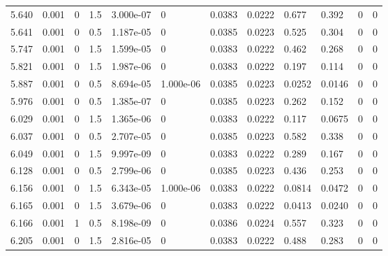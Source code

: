 \documentclass[preview]{standalone}
\begin{document}
{{{\begin{tabular}{L{1.2cm}C{1.2cm} C{0.3cm}C{0.5cm} C{1.4cm}C{1.4cm} C{1.4cm}C{1.4cm} C{1.6cm}C{1.6cm} C{1.6cm}C{1.6cm}}
  5.640  &  0.001  & 0     & 1.5 &  3.000e-07  & 0  &  0.0383&   0.0222& 0.677 & 0.392   &  0 & 0  \\ 
  5.641  &  0.001  & 0     & 0.5 &  1.187e-05  & 0  &  0.0385&   0.0223& 0.525 & 0.304   &  0 & 0  \\ 
  5.747  &  0.001  & 0     & 1.5 &  1.599e-05  & 0  &  0.0383&   0.0222& 0.462 & 0.268   &  0 & 0  \\ 
  5.821  &  0.001  & 0     & 1.5 &  1.987e-06  & 0  &  0.0383&   0.0222& 0.197 & 0.114   &  0 & 0  \\ 
  5.887  &  0.001  & 0     & 0.5 &  8.694e-05  & 1.000e-06  &  0.0385&   0.0223& 0.0252 & 0.0146   &  0 & 0  \\ 
  5.976  &  0.001  & 0     & 0.5 &  1.385e-07  & 0  &  0.0385&   0.0223& 0.262 & 0.152   &  0 & 0  \\ 
  6.029  &  0.001  & 0     & 1.5 &  1.365e-06  & 0  &  0.0383&   0.0222& 0.117 & 0.0675   &  0 & 0  \\ 
  6.037  &  0.001  & 0     & 0.5 &  2.707e-05  & 0  &  0.0385&   0.0223& 0.582 & 0.338   &  0 & 0  \\ 
  6.049  &  0.001  & 0     & 1.5 &  9.997e-09  & 0  &  0.0383&   0.0222& 0.289 & 0.167   &  0 & 0  \\ 
  6.128  &  0.001  & 0     & 0.5 &  2.799e-06  & 0  &  0.0385&   0.0223& 0.436 & 0.253   &  0 & 0  \\ 
  6.156  &  0.001  & 0     & 1.5 &  6.343e-05  & 1.000e-06  &  0.0383&   0.0222& 0.0814 & 0.0472   &  0 & 0  \\ 
  6.165  &  0.001  & 0     & 1.5 &  3.679e-06  & 0  &  0.0383&   0.0222& 0.0413 & 0.0240   &  0 & 0  \\ 
  6.166  &  0.001  & 1     & 0.5 &  8.198e-09  & 0  &  0.0386&   0.0224& 0.557 & 0.323   &  0 & 0  \\ 
  6.205  &  0.001  & 0     & 1.5 &  2.816e-05  & 0  &  0.0383&   0.0222& 0.488 & 0.283   &  0 & 0  \\ 
\hline 
\end{tabular} 

}}}
\end{document}
